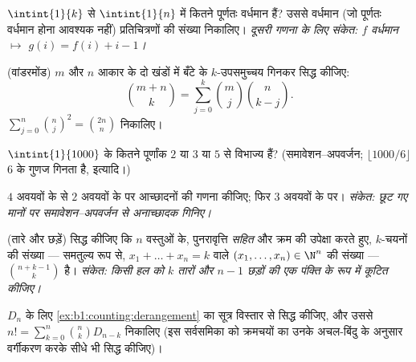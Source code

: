 \begin{exercise}[$\star\star$]\label{exo:b1:counting:6}
$\intint{1}{k}$ से $\intint{1}{n}$ में कितने पूर्णतः वर्धमान 
हैं? उससे वर्धमान (जो पूर्णतः वर्धमान होना आवश्यक नहीं) प्रतिचित्रणों की
संख्या निकालिए। \emph{दूसरी गणना के लिए संकेत: $f$ वर्धमान $\mapsto$ $g(i) =
f(i) + i - 1$।}
\end{exercise}

\begin{exercise}[$\star\star$]\label{exo:b1:counting:7}
(वांडरमोंड) $m$ और $n$ आकार के दो खंडों में बँटे  के $k$-उपसमुच्चय
गिनकर सिद्ध कीजिए:
\[
\binom{m+n}{k} = \sum_{j=0}^{k} \binom{m}{j} \binom{n}{k-j} .
\]
$\sum_{j=0}^{n} \binom nj^2 = \binom{2n}{n}$ निकालिए।
\end{exercise}

\begin{exercise}[$\star\star$]\label{exo:b1:counting:8}
$\intint{1}{1000}$ के कितने पूर्णांक $2$ या $3$ या $5$ से विभाज्य हैं?
(समावेशन--अपवर्जन; $\lfloor 1000/6 \rfloor$ $6$ के गुणज गिनता है, इत्यादि।)
\end{exercise}

\begin{exercise}[$\star\star$]\label{exo:b1:counting:9}
$4$ अवयवों के  से $2$ अवयवों के  पर आच्छादनों की गणना कीजिए;
फिर $3$ अवयवों के  पर। \emph{संकेत: छूट गए मानों पर समावेशन--अपवर्जन
से अनाच्छादक  गिनिए।}
\end{exercise}

\begin{exercise}[$\star\star$]\label{exo:b1:counting:10}
(तारे और छड़ें) सिद्ध कीजिए कि $n$ वस्तुओं के, पुनरावृत्ति \emph{सहित} और
क्रम की उपेक्षा करते हुए, $k$-चयनों की संख्या --- समतुल्य रूप से, $x_1 +
\dots + x_n = k$ वाले $(x_1, \dots, x_n) \in \N^n$ की संख्या --- $\binom{n +
k - 1}{k}$ है। \emph{संकेत: किसी हल को $k$ तारों और $n - 1$ छड़ों की एक
पंक्ति के रूप में कूटित कीजिए।}
\end{exercise}

\begin{exercise}[$\star\star\star$]\label{exo:b1:counting:11}
$D_n$ के लिए \cref{ex:b1:counting:derangement} का सूत्र विस्तार से सिद्ध
कीजिए, और उससे $n! = \sum_{k=0}^{n} \binom{n}{k} D_{n-k}$ निकालिए (इस
सर्वसमिका को क्रमचयों का उनके अचल-बिंदु  के अनुसार वर्गीकरण करके सीधे
भी सिद्ध कीजिए)।
\end{exercise}

